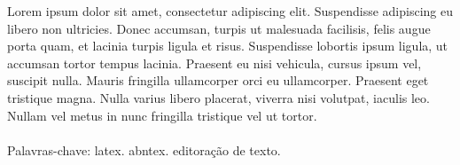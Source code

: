 
\begin{resumo}

Lorem ipsum dolor sit amet, consectetur adipiscing elit. Suspendisse adipiscing eu libero non ultricies. Donec accumsan, turpis ut malesuada facilisis, felis augue porta quam, et lacinia turpis ligula et risus. Suspendisse lobortis ipsum ligula, ut accumsan tortor tempus lacinia. Praesent eu nisi vehicula, cursus ipsum vel, suscipit nulla. Mauris fringilla ullamcorper orci eu ullamcorper. Praesent eget tristique magna. Nulla varius libero placerat, viverra nisi volutpat, iaculis leo. Nullam vel metus in nunc fringilla tristique vel ut tortor.
\\\\
\noindent
Palavras-chave: latex. abntex. editoração de texto.

\end{resumo}